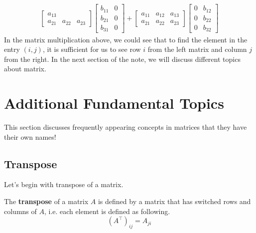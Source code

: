 \documentclass[../main.tex]{subfiles}
\begin{document}
\begin{align*}
\begin{bmatrix}
    \scriptstyle a_{13} \\
    \scriptstyle a_{21} &
    \scriptstyle a_{22} &
    \scriptstyle a_{23}
\end{bmatrix}
\begin{bmatrix}
    \scriptstyle b_{11} & \scriptstyle 0 \\
    \scriptstyle b_{21} & \scriptstyle 0 \\
    \scriptstyle b_{31} & \scriptstyle 0
\end{bmatrix}
+
\begin{bmatrix}
    \scriptstyle a_{11} &
    \scriptstyle a_{12} &
    \scriptstyle a_{13} \\
    \scriptstyle a_{21} &
    \scriptstyle a_{22} &
    \scriptstyle a_{23}
\end{bmatrix}
\begin{bmatrix}
    \scriptstyle 0 & \scriptstyle b_{12} \\
    \scriptstyle 0 & \scriptstyle b_{22} \\
    \scriptstyle 0 & \scriptstyle b_{32}
\end{bmatrix}
\end{align*}
In the matrix multiplication above, we could see that to find
the element in the entry $(i, j)$, it is sufficient for us to
see row $i$ from the left matrix and column $j$ from the right.
In the next section of the note, we will discuss different
topics about matrix.

\section{Additional Fundamental Topics}

This section discusses frequently appearing concepts in matrices
that they have their own names!

\subsection{Transpose}

Let's begin with transpose of a matrix.

\begin{definition}
The \textbf{transpose} of a matrix $A$ is defined by a matrix that
has switched rows and columns of $A$, i.e. each element is defined
as following.
\[
(A^\intercal)_{ij} = A_{ji}
\]
\end{definition}
\end{document}
